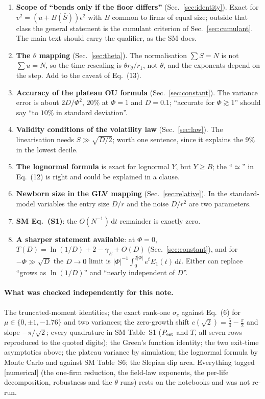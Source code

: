 \documentclass[11pt]{article}
\newcommand{\Sb}{\bar S}
\newcommand{\dd}{\mathrm d}
\newcommand{\numer}{\textsf{\small[numerical]}}
\begin{document}
\begin{enumerate}
\item \textbf{Scope of ``bends only if the floor differs''} (Sec.~\ref{sec:identity}).  Exact for $v^2=(u+B(\Sb))\epsilon^2$ with $B$
  common to firms of equal size; outside that class the general statement is the cumulant criterion of
  Sec.~\ref{sec:cumulant}.  The main text should carry the qualifier, as the SM does.
\item \textbf{The $\theta$ mapping} (Sec.~\ref{sec:theta}).  The normalisation $\sum S=N$ is not $\sum u=N$, so the time rescaling is
  $\theta r_\theta/r_1$, not $\theta$, and the exponents depend on the step.  Add to the caveat of Eq.~(13).
\item \textbf{Accuracy of the plateau OU formula} (Sec.~\ref{sec:constant}).  The variance error is about $2D/\Phi^2$, $20\%$ at $\Phi=1$
  and $D=0.1$; ``accurate for $\Phi\gtrsim1$'' should say ``to $10\%$ in standard deviation''.
\item \textbf{Validity conditions of the volatility law} (Sec.~\ref{sec:law}).  The linearisation needs $S\gg\sqrt{D/2}$; worth one
  sentence, since it explains the 9\% in the lowest decile.
\item \textbf{The lognormal formula} is exact for lognormal $Y$, but $Y\ge B$; the ``$\simeq$'' in Eq.~(12) is right and could be
  explained in a clause.
\item \textbf{Newborn size in the GLV mapping} (Sec.~\ref{sec:relative}).  In the standard-model variables the entry size $D/r$ and
  the noise $D/r^2$ are two parameters.
\item \textbf{SM Eq.~(S1)}: the $O(N^{-1})\,\dd t$ remainder is exactly zero.
\item \textbf{A sharper statement available}: at $\Phi=0$, $T(D)=\ln(1/D)+2-\gamma_E+O(D)$ (Sec.~\ref{sec:constant}), and for
  $-\Phi\gg\sqrt D$ the $D\to0$ limit is $|\Phi|^{-1}\int_0^{2|\Phi|}e^tE_1(t)\,\dd t$.  Either can replace ``grows as $\ln(1/D)$'' and
  ``nearly independent of $D$''.
\end{enumerate}

\paragraph{What was checked independently for this note.}  The truncated-moment identities; the exact rank-one $\sigma_c$
against Eq.~(6) for $\mu\in\{0,\pm1,-1.76\}$ and two variances; the zero-growth shift $c(\sqrt2)=\tfrac54-\tfrac\pi2$ and slope $-\pi/\sqrt2$;
every quadrature in SM Table~S1 ($P_{\rm est}$ and $T$, all seven rows reproduced to the quoted digits); the Green's function
identity; the two exit-time asymptotics above; the plateau variance by simulation; the lognormal formula by Monte Carlo and
against SM Table~S6; the Slepian dip area.  Everything tagged \numer{} (the one-firm reduction, the field-law exponents, the
per-life decomposition, robustness and the $\theta$ runs) rests on the notebooks and was not re-run.



\end{document}
